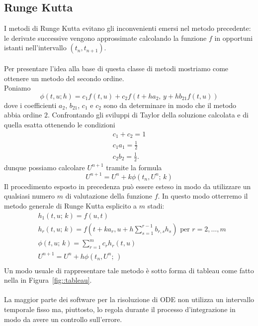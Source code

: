 \subsection{Runge Kutta}
I metodi di Runge Kutta evitano gli inconvenienti emersi nel metodo precedente: le derivate successive vengono  approssimate calcolando la funzione $f$ in  opportuni istanti  nell'intervallo $\left(t_n , t_{n+1}\right)$.\\ \\
Per presentare l'idea alla base di questa classe di metodi mostriamo come ottenere un metodo del secondo ordine.\\
Poniamo 
$$ \phi(t,u;h) = c_1 f(t,u) + c_2 f\left(t+ ha_2, \, y + hb_{21}f(t,u)\right)$$
dove i coefficienti $a_2$, $b_{21}$, $c_1$ e $c_2$ sono da determinare in modo che il metodo abbia ordine $2$.  Confrontando gli sviluppi di Taylor della soluzione calcolata e di quella esatta ottenendo le condizioni 
\begin{equation}
\begin{aligned}
c_1 + c_2 = 1\\
c_1a_1= \frac{1}{2}\\
c_2b_2 = \frac{1}{2}	.
\end{aligned}
\end{equation}
dunque possiamo calcolare $U^{n+1}$ tramite la formula
$$ U^{n+1} = U^n + k \phi\left(t_n,U^n;\,k\right)$$
Il procedimento esposto  in precedenza pu\`o essere esteso in modo da utilizzare un qualsiasi numero $m$ di valutazione della funzione $f$.  In questo modo otterremo il metodo generale di Runge Kutta esplicito a $m$ stadi:
\begin{equation}
\begin{aligned}
&h_1(t,u;\,k) = f(u,t) \\
&h_r(t,u;\,k) = f\left( t + k a_r, u + h \sum_{s=1}^{r-1} b_{r,s} h_s\right) \text{ per } r = 2, \dots, m \\
&\phi\left( t, u;\,k\right) = \sum_{r=1}^m c_r h_r(t,u)\\
&U^{n+1}= U^n + h \phi\left( t_n, U^n;\,\right)\\
\end{aligned}
\end{equation}
Un modo usuale di rappresentare tale metodo \`e sotto forma di tableau come fatto nella in Figura~\ref{fig::tableau}.\\ \\
La maggior parte dei software per la risoluzione di ODE non utilizza un intervallo temporale fisso ma, piuttosto, lo regola durante il processo d'integrazione in modo da avere un controllo sull'errore.\\
